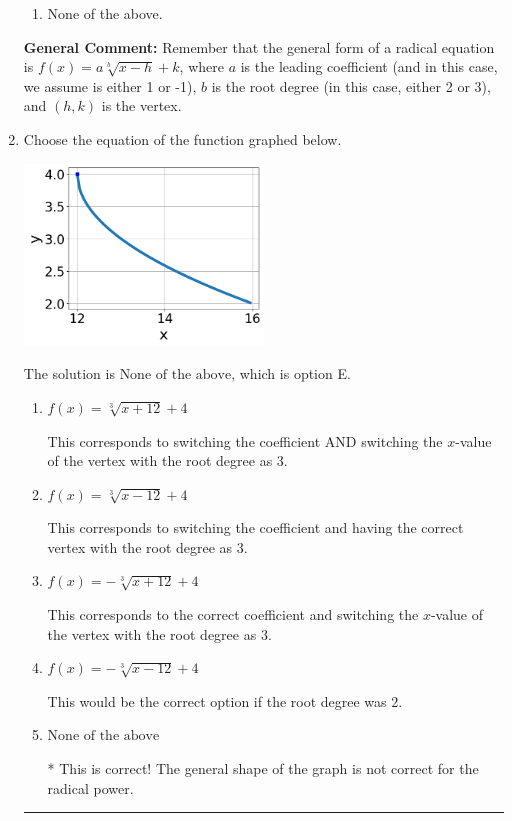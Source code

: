 \documentclass{extbook}[14pt]
\newcommand{\litem}[1]{\item #1

\rule{\textwidth}{0.4pt}}
\begin{document}
\begin{enumerate}
{\begin{enumerate}[label=\Alph*.]
\begin{multicols}{2}
\end{multicols}\item None of the above.\end{enumerate}
\textbf{General Comment:} Remember that the general form of a radical equation is $ f(x) = a \sqrt[b]{x - h} + k $, where $a$ is the leading coefficient (and in this case, we assume is either 1 or -1), $b$ is the root degree (in this case, either 2 or 3), and $(h, k)$ is the vertex.
}
\litem{
Choose the equation of the function graphed below.

\begin{center}
    \includegraphics[width=0.5\textwidth]{../Figures/radicalGraphToEquationB.png}
\end{center}


The solution is \( \text{None of the above} \), which is option E.\begin{enumerate}[label=\Alph*.]
\item \( f(x) = \sqrt[3]{x + 12} + 4 \)

This corresponds to switching the coefficient AND switching the $x$-value of the vertex with the root degree as $3$.
\item \( f(x) = \sqrt[3]{x - 12} + 4 \)

This corresponds to switching the coefficient and having the correct vertex with the root degree as $3$.
\item \( f(x) = - \sqrt[3]{x + 12} + 4 \)

This corresponds to the correct coefficient and switching the $x$-value of the vertex with the root degree as $3$.
\item \( f(x) = - \sqrt[3]{x - 12} + 4 \)

This would be the correct option if the root degree was $2$.
\item \( \text{None of the above} \)

* This is correct! The general shape of the graph is not correct for the radical power.
\end{enumerate}

}
\end{enumerate}
\end{document}
